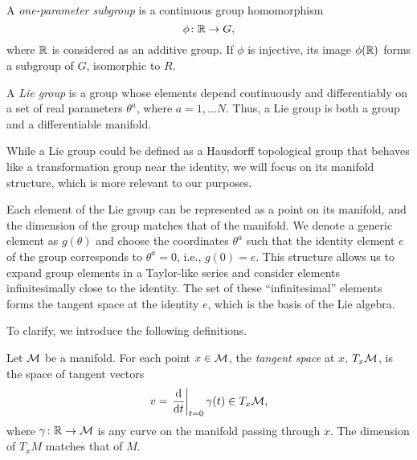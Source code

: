 \begin{definition}\label{def:one-parameter}
    A \emph{one-parameter subgroup} is a continuous group homomorphism
    \begin{equation}
        \phi\colon \mathbb{R} \to G ,
    \end{equation}
    where $\mathbb{R}$ is considered as an additive group. If $\phi$ is injective, its image $\phi(\mathbb{R})$ forms a subgroup of $G$, isomorphic to $R$.
\end{definition}

\begin{definition}
    A \emph{Lie group} is a group whose elements depend continuously and differentiably on a set of real parameters $\theta^a$, where  $a = 1, \dots N$. Thus, a Lie group is both a group and a differentiable manifold.
\end{definition}

\begin{remark}
    While a Lie group could be defined as a Hausdorff topological group that behaves
    like a transformation group near the identity, we will focus on its manifold structure, which
    is more relevant to our purposes.
\end{remark}

Each element of the Lie group can be represented as a point on its manifold, and the dimension of the group matches that of the manifold. We denote a generic element as $g(\theta)$ and choose the coordinates $\theta^a$ such that the identity element $e$ of the group corresponds to $\theta^a = 0$, i.e., $g(0) = e$. This structure allows us to expand group elements in a Taylor-like series and consider elements infinitesimally close to the identity. The set of these “infinitesimal” elements forms the tangent space at the identity $e$, which is the basis of the Lie algebra. 

To clarify, we introduce the following definitions.

\begin{definition}
    Let $\mathcal{M}$ be a manifold. For each point $x \in \mathcal{M}$, the \emph{tangent space} at $x$, $T_x \mathcal{M}$, is the space of tangent vectors
    \begin{equation}
        v = \left. \frac{\mathop{}\!\mathrm{d}}{\mathop{}\!\mathrm{d} t}\right|_{t=0} \gamma(t)  \in T_x \mathcal{M},
    \end{equation}
    where $\gamma\colon \mathbb{R} \to \mathcal{M}$ is any curve on the manifold passing through $x$. The dimension of $T_xM$ matches that of $M$.
\end{definition}

